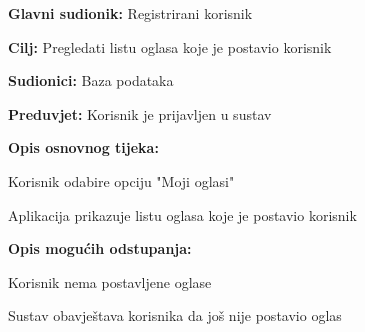\noindent {}
\begin{packed_item}
	
	\item \textbf{Glavni sudionik: }Registrirani korisnik
	\item  \textbf{Cilj:} Pregledati listu oglasa koje je postavio korisnik
	\item  \textbf{Sudionici:} Baza podataka
	\item  \textbf{Preduvjet:} Korisnik je prijavljen u sustav
	\item  \textbf{Opis osnovnog tijeka:}
	
	\item[] \begin{packed_enum}
		
		\item Korisnik odabire opciju "Moji oglasi"
		\item Aplikacija prikazuje listu oglasa koje je postavio korisnik

	\end{packed_enum}
	
	\item  \textbf{Opis mogućih odstupanja:}
	
	\item[] \begin{packed_item}
		
		\item[2.a] Korisnik nema postavljene oglase
		\item[] \begin{packed_enum}
			
			\item Sustav obavještava korisnika da još nije postavio oglas
			
		\end{packed_enum}
		
		
	\end{packed_item}
\end{packed_item}

